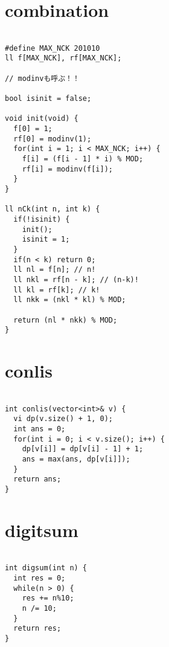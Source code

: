 \documentclass[a4j,titlepage]{jarticle} %
\begin{document}
\section{combination}
\color{black}
\begin{lstlisting}[caption=combination]

#define MAX_NCK 201010
ll f[MAX_NCK], rf[MAX_NCK];

// modinvも呼ぶ！！

bool isinit = false;

void init(void) {
  f[0] = 1;
  rf[0] = modinv(1);
  for(int i = 1; i < MAX_NCK; i++) {
    f[i] = (f[i - 1] * i) % MOD;
    rf[i] = modinv(f[i]);
  }
}

ll nCk(int n, int k) {
  if(!isinit) {
    init();
    isinit = 1;
  }
  if(n < k) return 0;
  ll nl = f[n]; // n!
  ll nkl = rf[n - k]; // (n-k)!
  ll kl = rf[k]; // k!
  ll nkk = (nkl * kl) % MOD;

  return (nl * nkk) % MOD;
}

\end{lstlisting}

\color{white}
\section{conlis}
\color{black}
\begin{lstlisting}[caption=conlis]

int conlis(vector<int>& v) {
  vi dp(v.size() + 1, 0);
  int ans = 0;
  for(int i = 0; i < v.size(); i++) {
    dp[v[i]] = dp[v[i] - 1] + 1;
    ans = max(ans, dp[v[i]]);
  }
  return ans;
}

\end{lstlisting}

\color{white}
\section{digitsum}
\color{black}
\begin{lstlisting}[caption=digitsum]

int digsum(int n) {
  int res = 0;
  while(n > 0) {
    res += n%10;
    n /= 10;
  }
  return res;
}

\end{lstlisting}

\color{white}
\end{document}
